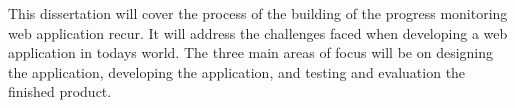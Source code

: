 This dissertation will cover the process of the building of the progress monitoring web application recur. It will address the challenges faced when developing a web application in todays world. The three main areas of focus will be on designing the application, developing the application, and testing and evaluation the finished product.\\